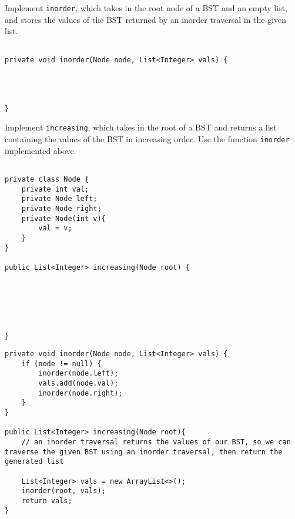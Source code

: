 \question Implement \lstinline$inorder$, which takes in the root node of a BST and an empty list, and stores the values of the BST returned by an inorder traversal in the given list.

\begin{lstlisting}

private void inorder(Node node, List<Integer> vals) {




}
\end{lstlisting}


\question Implement \lstinline$increasing$, which takes in the root of a BST and returns a list containing the values of the BST in increasing order. Use the function \lstinline$inorder$ implemented above.

\begin{lstlisting}

private class Node {
    private int val;
    private Node left;
    private Node right;
    private Node(int v){
        val = v;
    }
}

public List<Integer> increasing(Node root) {






}
\end{lstlisting}

\newpage
\begin{solution}
\begin{lstlisting}
private void inorder(Node node, List<Integer> vals) {
    if (node != null) {
        inorder(node.left);
        vals.add(node.val);
        inorder(node.right);
    }
}

public List<Integer> increasing(Node root){
    // an inorder traversal returns the values of our BST, so we can traverse the given BST using an inorder traversal, then return the generated list
    
    List<Integer> vals = new ArrayList<>();
    inorder(root, vals);
    return vals;
}

\end{lstlisting}
\end{solution}